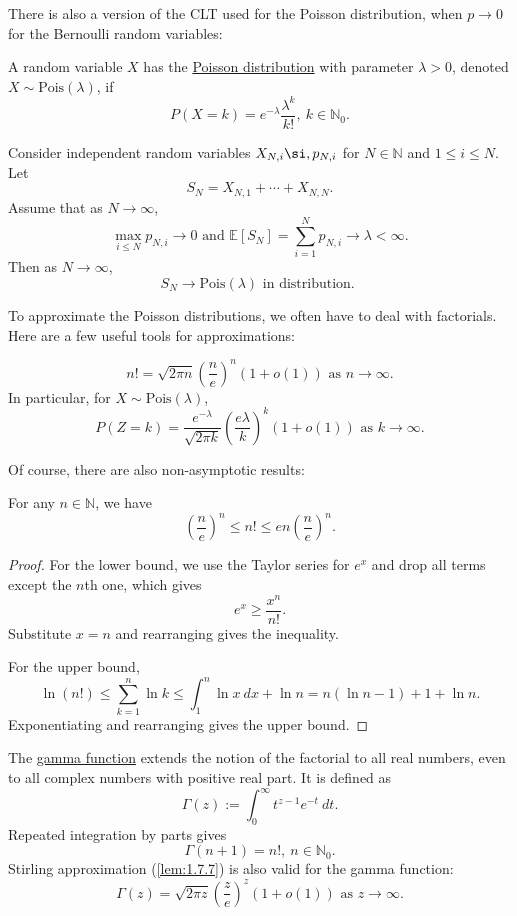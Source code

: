 There is also a version of the CLT used for the Poisson distribution, when $p \to 0$ for the Bernoulli 
random variables: 

\begin{definition}[]
\label{def:1.7.5}
A random variable $X$ has the \underline{Poisson distribution} with parameter $\lambda > 0$, denoted 
$X \sim \text{Pois}(\lambda)$, if 
\[ P(X = k) = e^{-\lambda} \frac{\lambda^k}{k!}, \ k \in \mathbb{N}_0. \]
\end{definition}

\begin{theorem}
\label{thm:1.7.6}
Consider independent random variables $X_{N, i} \si, p_{N, i}$ for $N \in \mathbb{N}$ and $1 \leq i \leq N$. 
Let 
\[ S_N = X_{N, 1} + \cdots + X_{N, N}. \]
Assume that as $N \to \infty$, 
\[ \max_{i \leq N} p_{N, i} \to 0 \text{  and  } \mathbb{E}[S_N] = \sum_{i = 1}^{N} p_{N, i} 
\to \lambda < \infty. \]
Then as $N \to \infty$, 
\[ S_N \to \text{Pois}(\lambda) \text{ in distribution. } \]
\end{theorem}

To approximate the Poisson distributions, we often have to deal with factorials. Here are a few useful tools 
for approximations:
\begin{lemma}
\label{lem:1.7.7}
\[ n! = \sqrt{2 \pi n} \left( \frac{n}{e} \right)^n (1 + o(1)) \text{ as } n\to \infty. \]
In particular, for $X \sim \text{Pois}(\lambda)$, 
\[ P(Z = k) = \frac{e^{-\lambda}}{\sqrt{2 \pi k}} \left( \frac{e \lambda}{k} \right)^k (1 + o(1)) 
\text{ as } k \to \infty. \]
\end{lemma}

Of course, there are also non-asymptotic results:
\begin{lemma}
\label{lem:1.7.8}
For any $n \in \mathbb{N}$, we have 
\[ \left( \frac{n}{e} \right)^n \leq n! \leq en \left( \frac{n}{e} \right)^n. \]
\end{lemma}

\begin{proof}
For the lower bound, we use the Taylor series for $e^x$ and drop all terms except the $n$th one, which 
gives 
\[ e^x \geq \frac{x^n}{n!}. \]
Substitute $x = n$ and rearranging gives the inequality.

For the upper bound, 
\[ \ln{(n!)} \leq \sum_{k = 1}^{n} \ln{k} \leq \int_{1}^{n} \ln{x} \ dx + \ln{n} 
= n(\ln{n} - 1) + 1 + \ln{n}. \]
Exponentiating and rearranging gives the upper bound.
\end{proof}

\begin{remark}
The \underline{gamma function} extends the notion of the factorial to all real numbers, even to all 
complex numbers with positive real part. It is defined as 
\[ \Gamma(z) := \int_{0}^{\infty} t^{z - 1}e^{-t} \ dt. \]
Repeated integration by parts gives 
\[ \Gamma(n + 1) = n!, \ n \in \mathbb{N}_0. \]
Stirling approximation (\cref{lem:1.7.7}) is also valid for the gamma function:
\[ \Gamma(z) = \sqrt{2 \pi z} \left( \frac{z}{e} \right)^z (1 + o(1)) \text{ as } z \to \infty. \]
\end{remark}

